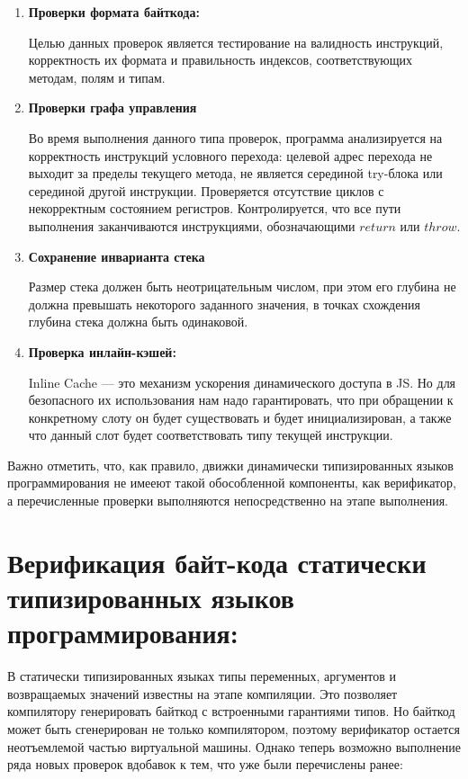 \begin{enumerate}

    \item \textbf{Проверки формата байткода:} 
        
    Целью данных проверок является тестирование на валидность инструкций, корректность их формата и 
    правильность индексов, соответствующих методам, полям и типам.

    \item \textbf{Проверки графа управления} 

    Во время выполнения данного типа проверок, программа анализируется 
    на корректность инструкций условного перехода: целевой адрес перехода не выходит за пределы 
    текущего метода, не является серединой try-блока или серединой другой инструкции. Проверяется отсутствие циклов 
    с некорректным состоянием регистров. Контролируется, что все пути выполнения заканчиваются 
    инструкциями, обозначающими $return$ или $throw$.

    \item \textbf{Сохранение инварианта стека}
    
    Размер стека должен быть неотрицательным числом, при этом его глубина не должна превышать некоторого
    заданного значения, в точках схождения глубина стека должна быть одинаковой.

    \item \textbf{Проверка инлайн-кэшей:}
    
    Inline Cache — это механизм ускорения динамического доступа в JS. Но для безопасного их использования
    нам надо гарантировать, что при обращении к конкретному слоту он будет существовать и будет 
    инициализирован, а также что данный слот будет соответствовать типу текущей инструкции.

\end{enumerate}

Важно отметить, что, как правило, движки динамически типизированных языков программирования не имееют такой обособленной компоненты, как 
верификатор, а перечисленные проверки выполняются непосредственно на этапе выполнения.

\section{Верификация байт-кода статически типизированных языков программирования:}
В статически типизированных языках типы переменных, аргументов и возвращаемых значений известны на 
этапе компиляции. Это позволяет компилятору генерировать байткод с встроенными гарантиями типов.
Но байткод может быть сгенерирован не только компилятором, поэтому верификатор остается неотъемлемой частью
виртуальной машины. Однако теперь возможно выполнение ряда новых проверок вдобавок к тем, что уже были 
перечислены ранее:

